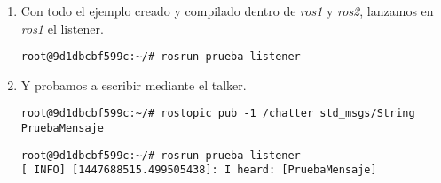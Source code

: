 \begin{enumerate}
\begin{enumerate}
			\item Con todo el ejemplo creado y compilado dentro de \emph{ros1} y \emph{ros2}, lanzamos en \emph{ros1} el listener.
			\begin{lstlisting}[style=consola]
root@9d1dbcbf599c:~/# rosrun prueba listener	
			\end{lstlisting}
			
			\item Y probamos a escribir mediante el talker.
			\begin{lstlisting}[style=consola]
root@9d1dbcbf599c:~/# rostopic pub -1 /chatter std_msgs/String PruebaMensaje
			\end{lstlisting}
			\begin{lstlisting}[style=consola]
root@9d1dbcbf599c:~/# rosrun prueba listener
[ INFO] [1447688515.499505438]: I heard: [PruebaMensaje]
			\end{lstlisting}

		\end{enumerate}
		
	\end{enumerate}